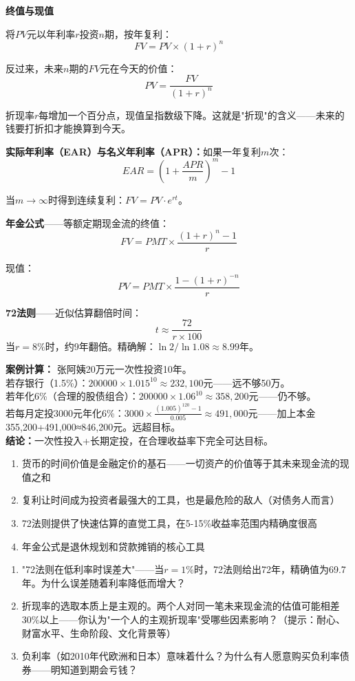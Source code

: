\documentclass[a4paper,11pt]{ctexbook}
\begin{document}
\begin{quantitative}
\textbf{终值与现值}

将$PV$元以年利率$r$投资$n$期，按年复利：
\[
FV = PV \times (1 + r)^n
\]

反过来，未来$n$期的$FV$元在今天的价值：
\[
PV = \frac{FV}{(1 + r)^n}
\]

折现率$r$每增加一个百分点，现值呈指数级下降。这就是"折现"的含义——未来的钱要打折扣才能换算到今天。

\textbf{实际年利率（EAR）与名义年利率（APR）：}如果一年复利$m$次：
\[
EAR = \left(1 + \frac{APR}{m}\right)^m - 1
\]

当$m \to \infty$时得到连续复利：$FV = PV \cdot e^{rt}$。

\textbf{年金公式}——等额定期现金流的终值：
\[
FV = PMT \times \frac{(1 + r)^n - 1}{r}
\]

现值：
\[
PV = PMT \times \frac{1 - (1 + r)^{-n}}{r}
\]

\textbf{72法则}——近似估算翻倍时间：
\[
t \approx \frac{72}{r \times 100}
\]
当$r=8\%$时，约9年翻倍。精确解：$\ln2 / \ln1.08 \approx 8.99$年。

\textbf{案例计算：} 张阿姨20万元一次性投资10年。\\
若存银行（1.5\%）：$200000 \times 1.015^{10} \approx 232,100$元——远不够50万。\\
若年化6\%（合理的股债组合）：$200000 \times 1.06^{10} \approx 358,200$元——仍不够。\\
若每月定投3000元年化6\%：$3000 \times \frac{(1.005)^{120} - 1}{0.005} \approx 491,000$元——加上本金355,200+491,000≈846,200元。远超目标。\\
\textbf{结论：}一次性投入+长期定投，在合理收益率下完全可达目标。
\end{quantitative}

\begin{lessonsummary}
\begin{enumerate}
  \item 货币的时间价值是金融定价的基石——一切资产的价值等于其未来现金流的现值之和
  \item 复利让时间成为投资者最强大的工具，也是最危险的敌人（对债务人而言）
  \item 72法则提供了快速估算的直觉工具，在5-15\%收益率范围内精确度很高
  \item 年金公式是退休规划和贷款摊销的核心工具
\end{enumerate}
\end{lessonsummary}

\begin{discuss}
\begin{enumerate}
  \item "72法则在低利率时误差大"——当$r=1\%$时，72法则给出72年，精确值为69.7年。为什么误差随着利率降低而增大？
  \item 折现率的选取本质上是主观的。两个人对同一笔未来现金流的估值可能相差30\%以上——你认为"一个人的主观折现率"受哪些因素影响？（提示：耐心、财富水平、生命阶段、文化背景等）
  \item 负利率（如2010年代欧洲和日本）意味着什么？为什么有人愿意购买负利率债券——明知道到期会亏钱？
\end{enumerate}
\end{discuss}
\end{document}
